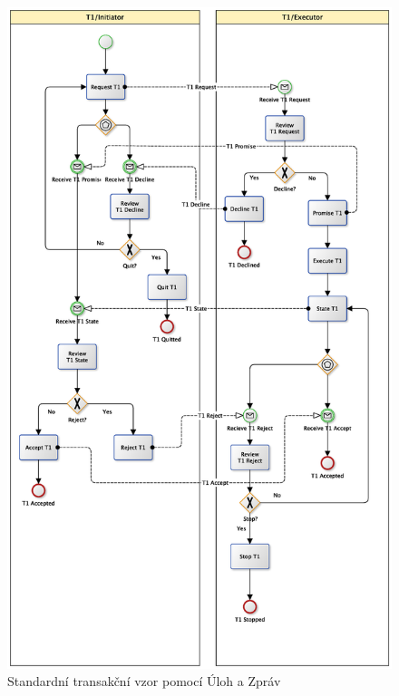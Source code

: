 \documentclass[]{article}
\begin{document}
\begin{figure}[H]\centering
\includegraphics[width=\textwidth,height=\textheight,keepaspectratio]{obrazky/transaction-standard-messages-1}
\caption{Standardní transakční vzor pomocí Úloh a Zpráv}
\label{fig:St_trans_ulohy_zpravy}
\end{figure}
\end{document}
